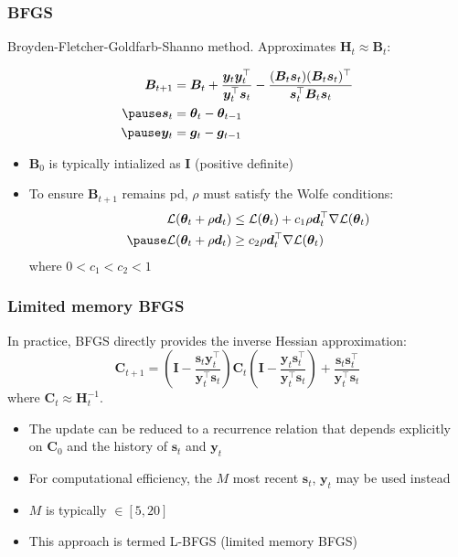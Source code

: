 \documentclass[smaller]{beamer}
\newcommand{\lt}{\left}
\newcommand{\rt}{\right}
\newcommand{\?}{\stackrel{?}{=}}
\newcommand{\fr}{\frac}
\renewcommand{\th}{\theta}
\newcommand{\mc}{\mathcal}
\newcommand{\tr}{^{\top}}
\newcommand{\pe}{\pause}
\begin{document}
\begin{frame}
  \frametitle{BFGS}
  \pe
  Broyden-Fletcher-Goldfarb-Shanno method. \pe Approximates $\bm H_t \approx \bm B_t$:\pe

  \begin{align}
    \bm B_{t+1} &= \bm B_t + \fr{\bm y_t\bm y_t\tr}{\bm y_t\tr\bm s_t}-
                  \fr{(\bm B_t\bm s_t)(\bm B_t\bm s_t)\tr}{\bm s_t\tr\bm B_t\bm s_t}\\\pe
    \bm s_t  &= \bm\th_t - \bm\th_{t-1}\\\pe
    \bm y_t &= \bm g_t - \bm g_{t-1}
  \end{align}
  \pe
  \begin{itemize}
  \item $\bm B_0$ is typically intialized as $\bm I$ (positive definite)
    \pe
  \item To ensure $\bm B_{t+1}$ remains pd, $\rho$ must satisfy the Wolfe conditions: \pe
    \begin{align}
      \mc{L}(\bm\th_{t} + \rho\bm d_{t}) &\le \mc{L}(\bm\th_{t}) + c_1\rho\bm d_{t}\tr\nabla\mc{L}(\bm\th_{t})\\\pe
      \mc{L}(\bm\th_t +\rho\bm d_t) &\ge c_2\rho\bm d_{t}\tr\nabla\mc{L}(\bm\th_{t})
    \end{align}
    \pe
    where $0< c_1 < c_2 < 1$
  \end{itemize}
\end{frame}

\begin{frame}
  \frametitle{Limited memory BFGS}
  \pe
  In practice, BFGS directly provides the inverse Hessian approximation:\pe
  \begin{equation}
    \bm C_{t+1} = \lt(\bm I - \fr{\bm s_t\bm y_t\tr}{\bm y_t\tr\bm s_t}\rt)\bm C_t
    \lt(\bm I - \fr{\bm y_t\bm s_t\tr}{\bm y_t\tr\bm s_t}\rt) + \fr{\bm s_t\bm s_t\tr}{\bm y_t\tr\bm s_t}
  \end{equation}
  \pe
  where $\bm C_t \approx \bm H_t^{-1}$.
  \pe
  \begin{itemize}
  \item The update can be reduced to a recurrence relation that depends explicitly on
    $\bm C_0$ and the
    history of $\bm s_t$ and $\bm y_t$\pe
  \item For computational efficiency, the $M$ most recent $\bm s_t$, $\bm y_t$ may be used instead
  \item $M$ is typically $\in [5,20]$
  \item This approach is termed L-BFGS (limited memory BFGS)
  \end{itemize}
\end{frame}
  
\end{document}
